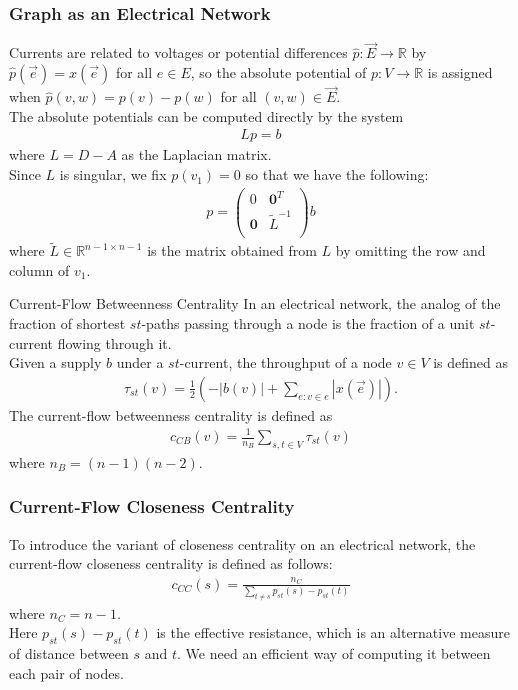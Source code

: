 \documentclass{beamer}
\begin{document}
\begin{frame}
     \frametitle{Graph as an Electrical Network}
          Currents are related to voltages or potential differences $\hat{p}:\vec{E} \rightarrow \mathbb{R}$ by $\hat{p}(\vec{e}) = x(\vec{e})$ for all $e \in E$, so the absolute potential of $p: V \rightarrow \mathbb{R}$ is assigned when $\hat{p}(v,w) = p(v) - p(w)$ for all $(v,w) \in \vec{E}$.\\
     \vspace{5mm}The absolute potentials can be computed directly by the system 
     \begin{align*}
     Lp = b 
     \end{align*}
     where $L = D-A$ as the Laplacian matrix. \\
     \vspace{5mm}
     Since $L$ is singular, we fix $p(v_1) = 0$ so that we have the following: 
     \begin{align*}
     p = \left( \begin{array}{cc}
0 & \mathbf{0}^T \\
\mathbf{0} & \widetilde{L}^{-1} \\
\end{array} \right) b
     \end{align*} where $\widetilde{L} \in \mathbb{R}^{n-1 \times n-1}$ is the matrix obtained from $L$ by omitting the row and column of $v_1$.
\end{frame}
\begin{frame}{Current-Flow Betweenness Centrality}
In an electrical network, the analog of the fraction of shortest $st$-paths passing through a node is the fraction of a unit $st$-current flowing through it. \\
\vspace{5mm}
Given a supply $b$ under a $st$-current, the throughput of a node $v \in V$ is defined as
\begin{align*}
\tau_{st}(v) = \frac{1}{2}\left( -\left|b(v) \right| + \sum_{e: v \in e} \left|x(\vec{e})\right|\right).
\end{align*}
The current-flow betweenness centrality is defined as
\begin{align*}
c_{CB}(v) = \frac{1}{n_B} \sum_{s,t \in V} \tau_{st}(v)
\end{align*}
where $n_B = (n-1)(n-2)$.
\end{frame}
\begin{frame}
\frametitle{Current-Flow Closeness Centrality}
To introduce the variant of closeness centrality on an electrical network, the current-flow closeness centrality is defined as follows:
\begin{align*}
c_{CC}(s) = \frac{n_C}{\displaystyle \sum_{t \neq s} p_{st}(s) - p_{st}(t)}
\end{align*}
where $n_C = n-1$.\\
\vspace{5mm}
Here $p_{st}(s) - p_{st}(t)$ is the effective resistance, which is an alternative measure of distance between $s$ and $t$. We need an efficient way of computing it between each pair of nodes.
\end{frame}
\end{document}
